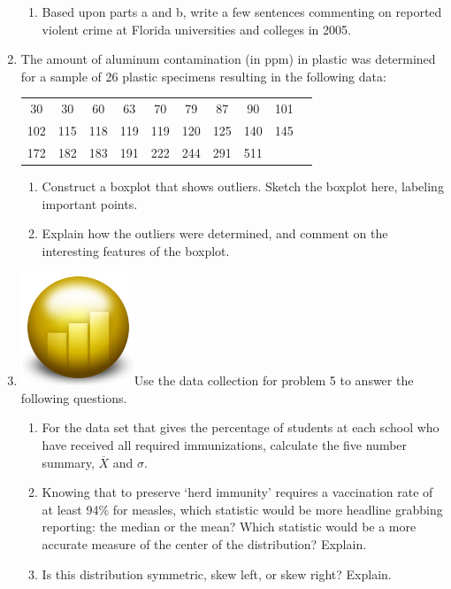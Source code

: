 \documentclass[12pt]{article}
\theoremstyle{plain}     %
\begin{document}
\begin{enumerate}
\begin{enumerate}
			\item Based upon parts a and b, write a few sentences commenting on reported violent crime at Florida universities and colleges in 2005.\\[4cm]
		\end{enumerate}
	
		\item The amount of aluminum contamination (in ppm) in plastic was determined for a sample of 26 plastic specimens resulting in the following data:
		
			\begin{tabular}{c c c c c c c c c c}
				30 & 30 & 60 & 63 & 70 & 79 & 87 & 90 &101\\ 102 & 115 & 118 & 119 & 119 & 120 & 125 & 140 & 145\\ 172 & 182 & 183 & 191 & 222 & 244 & 291 & 511
			\end{tabular}
		\begin{enumerate}
			\item Construct a boxplot that shows outliers. Sketch the boxplot here, labeling important points.\\[2cm]
			\item Explain how the outliers were determined, and comment on the interesting features of the boxplot.\\[4cm]
		\end{enumerate}
		
		\item \includegraphics[scale=.1]{fathom.png}Use the data collection for problem 5 to answer the following questions.
		\begin{enumerate}
			\item For the data set that gives the percentage of students at each school who have received all required immunizations, calculate the five number summary, $\overline{X}$ and $\sigma$.\\[1cm]
		\newpage
			\item Knowing that to preserve `herd immunity' requires a vaccination rate of at least 94\% for measles, which statistic would be more headline grabbing reporting: the median or the mean? Which statistic would be a more accurate measure of the center of the distribution? Explain.\\[4cm]
			\item Is this distribution symmetric, skew left, or skew right? Explain.\\[2cm]
			

\end{enumerate}
\end{enumerate}
\end{document}
